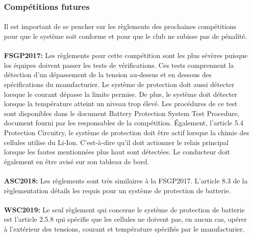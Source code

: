 	\subsubsection{Compétitions futures}
	
	\paragraph{}
	Il est important de se pencher sur les règlements des prochaines compétitions pour que le système soit conforme et pour que le club ne subisse pas de pénalité.
	
		\paragraph{}   \textbf{FSGP2017:}
		Les règlements pour cette compétition sont les plus sévères puisque les équipes doivent passer les tests de vérifications. Ces tests comprennent la détection d'un dépassement de la tension au-dessus et en dessous des spécifications du manufacturier. Le système de protection doit aussi détecter lorsque le courant dépasse la limite permise. De plus, le système doit détecter lorsque la température atteint un niveau trop élevé. Les procédures de ce test sont disponibles dans le document Battery Protection System Test Procedure, document fourni par les responsables de la compétition. Également, l'article 5.4 Protection Circuitry, le système de protection doit être actif lorsque la chimie des cellules utilise du Li-Ion. C'est-à-dire qu'il doit actionner le relais principal lorsque les fautes mentionnées plus haut sont détectées. Le conducteur doit également en être avisé sur son tableau de bord. \cite{reg_fsgp2017}
		
		\paragraph{}   \textbf{ASC2018:}
		Les règlements sont très similaires à la FSGP2017. L'article 8.3 de la règlementation détails les requis pour un système de protection de batterie. \cite{reg_asc2018}
		
		\paragraph{}   \textbf{WSC2019:}
		Le seul règlement qui concerne le système de protection de batterie est l'article 2.5.8 qui spécifie que les cellules ne doivent pas, en aucun cas, opérer à l'extérieur des tensions, courant et température spécifiés par le manufacturier. \cite{reg_wsc2017}